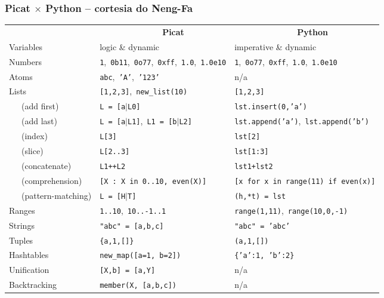 \begin{frame}[fragile]
	\frametitle{Picat $\times$  Python  -- cortesia do Neng-Fa}
	
\vspace{-0.5 cm}

\begin{scriptsize}

	\hspace*{-9 mm}\begin{tabular}{|l|l|l|} \cline{1-3}
				& \ \ \ \ \ \ \ \ \ \ \ \ \ \ \ {\bf Picat} &  \ \ \ \ \ \ \ \ \ \ \ \ \ \ \  {\bf Python} \\ \cline{1-3}
				Variables & logic \& dynamic & imperative \& dynamic \\
				Numbers & \texttt{1},\  \texttt{0b11},\  \texttt{0o77},\  \texttt{0xff},\  \texttt{1.0},\  \texttt{1.0e10} & \texttt{1},\  \texttt{0o77},\  \texttt{0xff},\  \texttt{1.0},\  \texttt{1.0e10} \\
				Atoms   & \texttt{abc},\  \texttt{'A'},\  \texttt{'123'} & n/a \\
				Lists   & \texttt{[1,2,3]},\ \texttt{new\_list(10)} & \texttt{[1,2,3]} \\
				\ \ \ (add first) &  \texttt{L = [a$|$L0]}& \texttt{lst.insert(0,'a')} \\
				\ \ \ (add last) &  \texttt{L = [a$|$L1]},\ \texttt{L1 = [b$|$L2]} & \texttt{lst.append('a')},\ \texttt{lst.append('b')} \\
				\ \ \ (index) & \texttt{L[3]}  & \texttt{lst[2]} \\
				\ \ \ (slice) & \texttt{L[2..3]}  & \texttt{lst[1:3]} \\
				\ \ \ (concatenate) & \texttt{L1++L2}  & \texttt{lst1+lst2} \\    
				\ \ \ (comprehension) &  \texttt{[X : X in 0..10,\  even(X)]}  & \texttt{[x for x in range(11) if even(x)]} \\
				\ \ \ (pattern-matching) & \texttt{L = [H$|$T]}  & \texttt{(h,*t) = lst} \\
				Ranges  & \texttt{1..10},\ \texttt{10..-1..1} & \texttt{range(1,11)},\ \texttt{range(10,0,-1)} \\
				Strings & \texttt{"abc" = [a,b,c]} & \texttt{"abc" = 'abc'} \\
				Tuples & \texttt{\{a,1,[]\}} & \texttt{(a,1,[])} \\
				Hashtables   & \texttt{new\_map([a=1,\ b=2])} & \texttt{\{'a':1,\  'b':2\}} \\
				Unification   & \texttt{[X,b] = [a,Y]} & n/a \\
				Backtracking   & \texttt{member(X,\ [a,b,c])} &  n/a \\ \cline{1-3}        
			\end{tabular}
		\end{scriptsize}
	

\end{frame}




